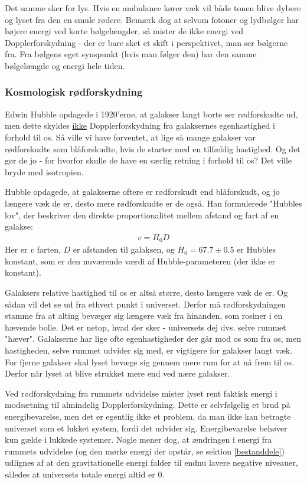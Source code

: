 Det samme sker for lys. Hvis en ambulance kører væk vil både tonen blive dybere og lyset fra den en smule rødere. Bemærk dog at selvom fotoner og lydbølger har højere energi ved korte bølgelængder, så mister de ikke energi ved Dopplerforskydning - der er bare sket et skift i perspektivet, man ser bølgerne fra. Fra bølgens eget synspunkt (hvis man følger den) har den samme bølgelængde og energi hele tiden.
\subsubsection{Kosmologisk rødforskydning}
Edwin Hubble opdagede i 1920'erne, at galakser langt borte ser rødforskudte ud, men dette skyldes \underline{ikke} Dopplerforskydning fra galaksernes egenhastighed i forhold til os. Så ville vi have forventet, at lige så mange galakser var rødforskudte som blåforskudte, hvis de starter med en tilfældig hastighed. Og det gør de jo - for hvorfor skulle de have en særlig retning i forhold til os? Det ville bryde med isotropien. 

Hubble opdagede, at galakserne oftere er rødforskudt end blåforskudt, og jo længere væk de er, desto mere rødforskudte er de også. Han formulerede "Hubbles lov", der beskriver den direkte proportionalitet mellem afstand og fart af en galakse:
\begin{align}
v=H_0 D \label{Hubbleslaw}
\end{align}
Her er $v$ farten, $D$ er afstanden til galaksen, og $H_0=67.7\pm0.5$ er Hubbles konstant, som er den nuværende værdi af Hubble-parameteren (der ikke er konstant).

Galaksers relative hastighed til os er altså større, desto længere væk de er. Og sådan vil det se ud fra ethvert punkt i universet. Derfor må rødforskydningen stamme fra at alting bevæger sig længere væk fra hinanden, som rosiner i en hævende bolle. Det er netop, hvad der sker - universets dej dvs. selve rummet "hæver". Galakserne har lige ofte egenhastigheder der går mod os som fra os, men hastigheden, selve rummet udvider sig med, er vigtigere for galakser langt væk. For fjerne galakser skal lyset bevæge sig gennem mere rum for at nå frem til os. Derfor når lyset at blive strukket mere end ved nære galakser. 

Ved rødforskydning fra rummets udvidelse mister lyset rent faktisk energi i modsætning til almindelig Dopplerforskydning. Dette er selvfølgelig et brud på energibevarelse, men det er egentlig ikke et problem, da man ikke kan betragte universet som et lukket system, fordi det udvider sig. Energibevarelse behøver kun gælde i lukkede systemer. Nogle mener dog, at ændringen i energi fra rummets udvidelse (og den mørke energi der opstår, se sektion \ref{bestanddele}) udlignes af at den gravitationelle energi falder til endnu lavere negative niveauer, således at universets totale energi altid er 0.

